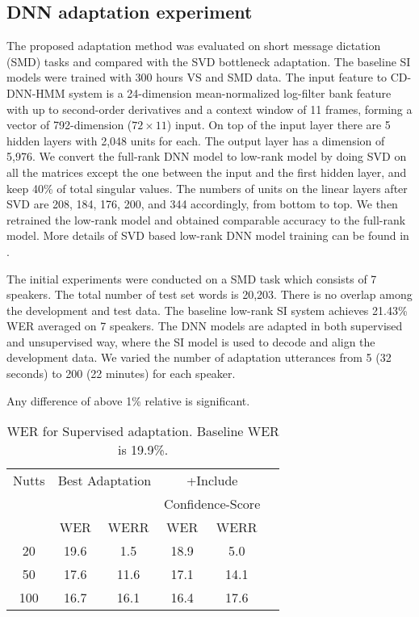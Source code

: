 \subsection{DNN adaptation experiment}
The proposed adaptation method was evaluated on short message dictation (SMD) tasks and compared with the SVD bottleneck adaptation.
The baseline SI models were trained with 300 hours VS and SMD data. The input feature to CD-DNN-HMM system is a 24-dimension mean-normalized log-filter bank feature with up to second-order derivatives and a context window of 11 frames, forming a vector of 792-dimension ($72 \times 11$) input. On top of the input layer there are 5 hidden layers with 2,048 units for each. The output layer has a dimension of 5,976.
We convert the full-rank DNN model to low-rank model by doing SVD on all the matrices except the one between the input and the first hidden layer, and keep 40\% of total singular values. The numbers of units on the linear layers after SVD are 208, 184, 176, 200, and 344 accordingly, from bottom to top. We then retrained the low-rank model and obtained comparable accuracy to the full-rank model. More details of SVD based low-rank DNN model training can be found in \cite{xue-2013}.

The initial experiments were conducted on a SMD task which consists of 7 speakers.
The total number of test set words is 20,203. There is no overlap among the development and test data.
The baseline low-rank SI system achieves 21.43\% WER averaged on 7 speakers.
The DNN models are adapted in both supervised and unsupervised way, where the SI model is used to decode and align the development data.
We varied the number of adaptation utterances from 5 (32 seconds) to 200 (22 minutes) for each speaker.

Any difference of above 1\% relative is significant.



\begin{table}
\begin{center}
\begin{small}
\caption{WER for Supervised adaptation. Baseline WER is 19.9\%.} \label{tab:mean-FA-diff}
\begin{tabular}{|c|c|c|c|c|c|}
\hline
Nutts &  \multicolumn{2}{|c|}{Best Adaptation} & \multicolumn{2}{|c|}{+Include} \\
&  \multicolumn{2}{|c|}{ }  & \multicolumn{2}{|c|}{Confidence-Score} \\
\hline
 &   WER & WERR & WER & WERR\\
\hline
20 &  19.6  & 1.5  & 18.9 & 5.0\\
50 &  17.6  & 11.6  & 17.1 & 14.1\\
100 &  16.7  & 16.1  & 16.4 & 17.6\\
\hline
\end{tabular}
\end{small}
\end{center}
\end{table}

